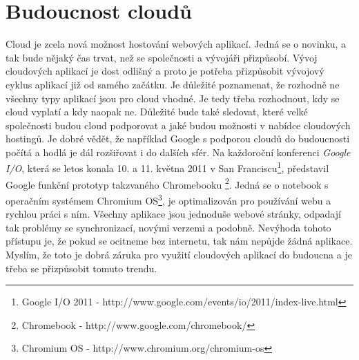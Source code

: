\section{Budoucnost cloudů}
Cloud je zcela nová možnost hostování webových aplikací. Jedná se o novinku, a tak bude nějaký čas trvat, než se společnosti a vývojáři přizpůsobí. Vývoj cloudových aplikací je dost odlišný a proto je potřeba přizpůsobit vývojový cyklus aplikací již od samého začátku. Je důležité poznamenat, že rozhodně ne všechny typy aplikací jsou pro cloud vhodné. Je tedy třeba rozhodnout, kdy se cloud vyplatí a kdy naopak ne. Důležité bude také sledovat, které velké společnosti budou cloud podporovat a jaké budou možnosti v nabídce cloudových hostingů. Je dobré vědět, že například Google s podporou cloudů do budoucnosti počítá a hodlá je dál rozšiřovat i do dalších sfér. Na každoroční konferenci \emph{Google I/O}, která se letos konala 10. a 11. května 2011 v San Franciscu\footnote{Google I/O 2011 - http://www.google.com/events/io/2011/index-live.html}, představil Google funkční prototyp takzvaného Chromebooku \footnote{Chromebook - http://www.google.com/chromebook/}. Jedná se o notebook s operačním systémem Chromium OS\footnote{Chromium OS - http://www.chromium.org/chromium-os}, je optimalizován pro používání webu a rychlou práci s ním. Všechny aplikace jsou jednoduše webové stránky, odpadají tak problémy se synchronizací, novými verzemi a podobně. Nevýhoda tohoto přístupu je, že pokud se ocitneme bez internetu, tak nám nepůjde žádná aplikace. Myslím, že toto je dobrá záruka pro využití cloudových aplikací do budoucna a je třeba se přizpůsobit tomuto trendu.
